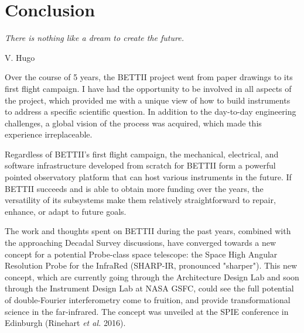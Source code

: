 
\chapter[Conclusion]{Conclusion} %
\label{chap:conclusion}


\epigraph{\small\itshape There is nothing like a dream to create the future.}{V. Hugo}


Over the course of 5 years, the BETTII project went from paper drawings to its first flight campaign. I have had the opportunity to be involved in all aspects of the project, which provided me with a unique view of how to build instruments to address a specific scientific question. In addition to the day-to-day engineering challenges, a global vision of the process was acquired, which made this experience irreplaceable.

Regardless of BETTII's first flight campaign, the mechanical, electrical, and software infrastructure developed from scratch for BETTII form a powerful pointed observatory platform that can host various instruments in the future. If BETTII succeeds and is able to obtain more funding over the years, the versatility of its subsystems make them relatively straightforward to repair, enhance, or adapt to future goals.

The work and thoughts spent on BETTII during the past years, combined with the approaching Decadal Survey discussions, have converged towards a new concept for a potential Probe-class space telescope: the Space High Angular Resolution Probe for the InfraRed (SHARP-IR, pronounced "sharper"). This new concept, which are currently going through the Architecture Design Lab and soon through the Instrument Design Lab at NASA GSFC, could see the full potential of double-Fourier interferometry come to fruition, and provide transformational science in the far-infrared. The concept was unveiled at the SPIE conference in Edinburgh (Rinehart \textit{et al.} 2016). 




